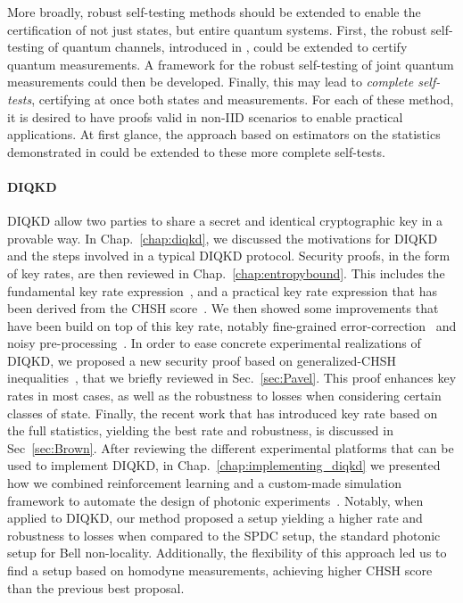 \medbreak

More broadly, robust self-testing methods should be extended to enable the certification of not just states, but entire quantum systems.
First, the robust self-testing of quantum channels, introduced in \cite{Sekatski2018}, could be extended to certify quantum measurements.
A framework for the robust self-testing of joint quantum measurements could then be developed.
Finally, this may lead to \textit{complete self-tests}, certifying at once both states and measurements.
For each of these method, it is desired to have proofs valid in non-IID scenarios to enable practical applications.
At first glance, the approach based on estimators on the statistics demonstrated in \cite{Bancal2021} could be extended to these more complete self-tests. 



\paragraph{DIQKD}

\acrfull{DIQKD} allow two parties to share a secret and identical cryptographic key in a provable way.
In Chap.~\ref{chap:diqkd}, we discussed the motivations for DIQKD and the steps involved in a typical DIQKD protocol.
Security proofs, in the form of key rates, are then reviewed in Chap.~\ref{chap:entropybound}. 
This includes the fundamental key rate expression~\cite{Devetak2005}, and a practical key rate expression that has been derived from the CHSH score~\cite{Pironio2009}. 
We then showed some improvements that have been build on top of this key rate, notably fine-grained error-correction~\cite{Ma2012} and noisy pre-processing~\cite{Ho2020,Woodhead2021}. 
In order to ease concrete experimental realizations of DIQKD, we proposed a new security proof based on generalized-CHSH inequalities~\cite{Sekatski2021}, that we briefly reviewed in Sec.~\ref{sec:Pavel}.
This proof enhances key rates in most cases, as well as the robustness to losses when considering certain classes of state.
Finally, the recent work \cite{Brown2021} that has introduced key rate based on the full statistics, yielding the best rate and robustness, is discussed in Sec~\ref{sec:Brown}.
After reviewing the different experimental platforms that can be used to implement DIQKD, in Chap.~\ref{chap:implementing_diqkd} we presented how we combined reinforcement learning and a custom-made simulation framework to automate the design of photonic experiments~\cite{Valcarce2022b}.
Notably, when applied to DIQKD, our method proposed a setup yielding a higher rate and robustness to losses when compared to the SPDC setup, the standard photonic setup for Bell non-locality.
Additionally, the flexibility of this approach led us to find a setup based on homodyne measurements, achieving higher CHSH score than the previous best proposal.


